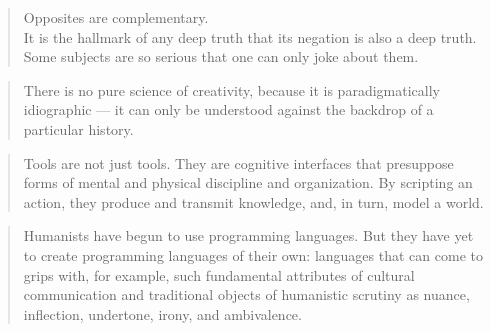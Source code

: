 \begin{quotation}
  Opposites are complementary.\\
  It is the hallmark of any deep truth that its negation is also a deep truth.\\
  Some subjects are so serious that one can only joke about them.
\end{quotation}

\begin{quotation}
  There is no pure science of creativity, because it is paradigmatically idiographic --- it can only be understood against the backdrop of a particular history.
\end{quotation}

\begin{quote}
  Tools are not just tools. They are cognitive interfaces that presuppose forms of mental and physical discipline and organization. By scripting an action, they produce and transmit knowledge, and, in turn, model a world. 
\end{quote}

\begin{quote}
  Humanists have begun to use programming languages. But they have yet to create programming languages of their own: languages that can come to grips with, for example, such fundamental attributes of cultural communication and traditional objects of humanistic scrutiny as nuance, inflection, undertone, irony, and ambivalence. 
\end{quote}


\clearpage